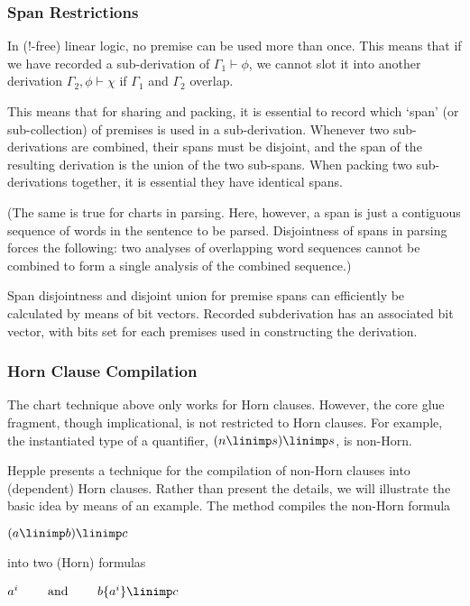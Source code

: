 \subsubsection{Span Restrictions}
In (!-free) linear logic, no premise can be used more than once.  
This means that if we have recorded a sub-derivation of
$\Gamma_1\vdash\phi$, we cannot slot it into another derivation
$\Gamma_2,\phi\vdash\chi$ if $\Gamma_1$ and $\Gamma_2$ overlap.

This means that for   sharing and packing, it is essential 
to record which `span' (or sub-collection) of premises is used in a
sub-derivation.  Whenever two sub-derivations are combined, their spans
must be disjoint, and the span of the resulting derivation is the
union of the two sub-spans.  When packing two sub-derivations
together, it is essential they have identical spans.  

(The same is true for charts in parsing.  Here, however, a
span is just a contiguous sequence of words in the sentence to be
parsed.  Disjointness of spans in parsing forces the following:
two analyses of overlapping word sequences cannot be combined to
form a single analysis of the combined sequence.)

Span disjointness and disjoint union for premise
spans can efficiently 
be calculated by means of bit vectors.  Recorded subderivation
has an associated bit vector, with bits set for each premises used
in constructing the derivation.


\subsubsection{Horn Clause Compilation}
The chart technique above only works for Horn clauses.  However, the core
glue fragment, though implicational, is not restricted to Horn clauses.
For example, the instantiated type of a quantifier, $(n\linimp s)\linimp s$,
is non-Horn.

Hepple presents a technique for the compilation of non-Horn clauses
into (dependent) Horn clauses.  Rather than present the details, we will
illustrate the basic idea by means of an example.
The method compiles the non-Horn formula  

\smallskip 
\hspace*{5em}$(a\linimp b)\linimp c$

\smallskip\noindent
into two (Horn) formulas

\smallskip 
\hspace*{5em}$a^i \mbox{\hspace*{2em} and \hspace*{2em}} b\{a^i\}\linimp c$

